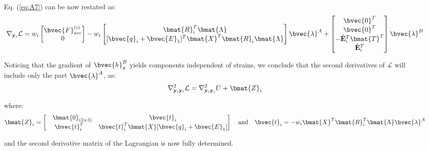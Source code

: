 \begin{appendices}
\noindent Eq. (\ref{eq:A7}) can be now restated as:
\begin{gather}
	\nabla_{\mathbf{y}_i}\mathcal{L} = w_i\begin{bmatrix}
		\bvec{F}_{sec}^{(i)} \\ 0
	\end{bmatrix} - w_i\begin{bmatrix}
		\bmat{R}_i^T\bmat{\Lambda} \\
		[\bvec{q}_i+\bvec{E}_1]^T\bmat{X}^T\bmat{R}_i\bmat{\Lambda}
	\end{bmatrix}\bvec{\lambda}^A + \begin{bmatrix}
		\bvec{0}^T \\ \bvec{0}^T \\ -\hat{\mathbf{E}}_i^T\bmat{T}^T \\ 
		\hat{\mathbf{E}}_i^T
	\end{bmatrix}\bvec{\lambda}^B
	\label{eq:this}
\end{gather}

\noindent Noticing that the gradient of $\bvec{h}_g^B$ yields components 
independent of
strains, we conclude that the second derivatives of $\mathcal{L}$ will include
only the part $\bvec{\lambda}^A$, as:
\begin{gather}
	\nabla^2_{\mathbf{y}_i\mathbf{y}_i}\mathcal{L} =
	\nabla^2_{\mathbf{y}_i\mathbf{y}_i}U
	+ \bmat{Z}_i
	\label{eq:second}
\end{gather}

\noindent where:
\begin{gather}
	\bmat{Z}_i = \begin{bmatrix}
		\ \ \ \bmat{0}_{(3\times 3)} & \bvec{t}_i\\ \bvec{t}_i^T &
		\bvec{t}_i^T\bmat{X}[\bvec{q}_i+\bvec{E}_1]
	\end{bmatrix}\quad\text{and}\quad \bvec{t}_i =
	-w_i\bmat{X}^T\bmat{R}_i^T\bmat{\Lambda}\bvec{\lambda}^A\nonumber
\end{gather}

\noindent and the second derivative matrix of the Lagrangian is now fully
determined.

\end{appendices}